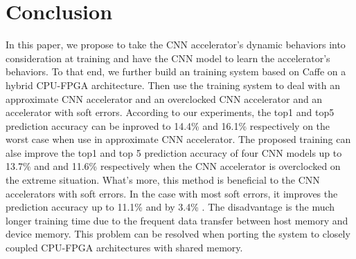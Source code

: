 \section{Conclusion} \label{sec:Conclusion}
In this paper, we propose to take the CNN accelerator’s dynamic behaviors into consideration 
at training and have the CNN model to learn the accelerator’s behaviors. To that end, we further build 
an training system based on Caffe on a hybrid CPU-FPGA architecture. Then use the training 
system to deal with an approximate CNN accelerator and an overclocked CNN accelerator 
and an accelerator with soft errors. According to our 
experiments, the top1 and top5 prediction accuracy can be inproved to 14.4\% and 16.1\% respectively 
on the worst case when use in approximate CNN accelerator.
The proposed training can alse improve the top1 and top 5 prediction accuracy 
of four CNN models up to 13.7\% and and 11.6\% respectively when 
the CNN accelerator is overclocked on the extreme situation. What's more, this method is beneficial to the CNN 
accelerators with soft errors. In the case with most soft errors, it improves the prediction accuracy up 
to 11.1\% and by 3.4\% . The disadvantage is the much longer training time due to the frequent 
data transfer between host memory and device memory. This problem can be resolved when porting the system 
to closely coupled CPU-FPGA architectures with shared memory.



